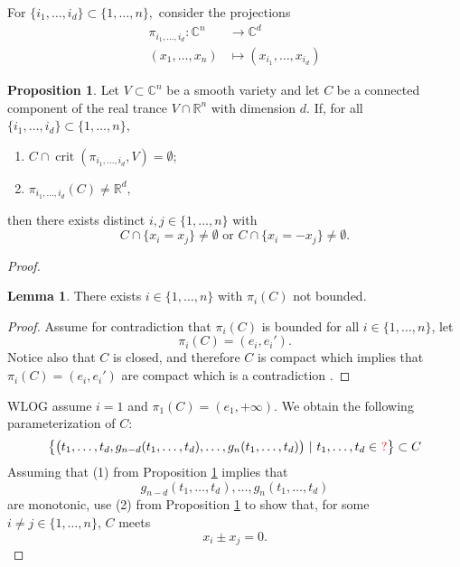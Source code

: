 \documentclass[11pt]{article}
\date{}
\theoremstyle{definition}
\newtheorem{proposition}{Proposition}
\newtheorem{lemma}{Lemma}
\newcommand{\C}{\mathbb{C}}
\newcommand{\R}{\mathbb{R}}
\providecommand{\keywords}[1]
{
  \smallskip\noindent\small	
  \textbf{\textbf{Keywords---}} #1
}
\DeclareMathOperator{\crit}{crit}
\begin{document}






\newpage 




For $\{i_1,\hdots,i_d\} \subset \{1,\dots,n\},$ consider the projections
\begin{align*}
    \pi_{i_1,\hdots,i_d}: \C^n  &\rightarrow \C^d \\
    (x_1,\hdots,x_n) &\mapsto  (x_{i_1},\hdots,x_{i_d})    
\end{align*}
%
\begin{proposition}\label{prop:main}
Let $V \subset \C^n$ be a smooth variety and let $C$ be a connected component of the real trance $V \cap \R^n$ with dimension $d$. If, for all $\{i_1,\hdots,i_d\} \subset \{1,\dots,n\}$, 
\begin{enumerate}
    \item $C \cap \crit(\pi_{i_1,\hdots,i_d},V) = \emptyset$;
    \item $\pi_{i_1,\hdots,i_d}(C) \not = \R^d,$
\end{enumerate}
then there exists distinct $i,j \in\{1,\hdots,n\}$ with
    \[
C \cap \{ x_i= x_j\} \not = \emptyset \textrm{ or }
C \cap \{ x_i= -x_j\} \not = \emptyset. 
    \]
\end{proposition}
%
\begin{proof}




\begin{lemma}
    There exists $i \in \{1,\hdots,n\}$ with $\pi_i(C)$ not bounded. 
\end{lemma}
\begin{proof}
    Assume for contradiction that $\pi_i(C)$ is bounded for all $i \in \{1,\hdots,n\}$, let  
    \[
\pi_i(C) = (e_i,e_i').
    \]
Notice also that $C$ is closed, and therefore $C$ is compact which implies that $\pi_i(C) = (e_i,e_i')$ are compact which is a contradiction \lightning.
\end{proof}
\noindent
WLOG assume $i=1$ and $\pi_1(C) = (e_1,+\infty).$ We obtain the following parameterization of $C$: 
%
\[
\big\{\big(t_1,\hdots,t_d,g_{n-d}(t_1,\hdots,t_d),\hdots,g_{n}(t_1,\hdots,t_d)\big)~|~ t_1,\hdots,t_d \in \color{red}~?\color{black}\big\} \subset C
\]
%
Assuming that (1) from Proposition \ref{prop:main} implies that 
\[
g_{n-d}(t_1,\hdots,t_d),\hdots,g_{n}(t_1,\hdots,t_d)
\]
are monotonic, use (2) from Proposition \ref{prop:main} to show that, for some $i\not =j \in \{1,\hdots,n\}$, $C$ meets 
\[
x_i \pm x_j = 0.
\]



    
\end{proof}
\end{document}
